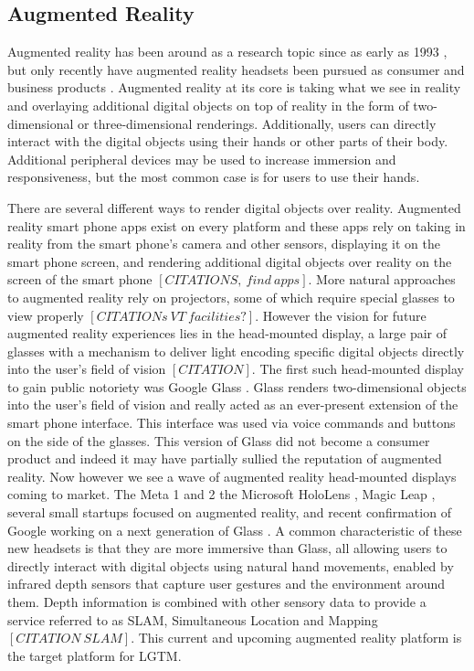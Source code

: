 \documentclass[12pt]{report}
\begin{document}
\subsection{Augmented Reality}
Augmented reality has been around as a research topic since as early as 1993 \cite{RealWorldArWellnet1993}, but only recently have augmented reality headsets been pursued as consumer and business products \cite{MagicLeapWebsite,MetaWebsite,HoloLensWebsite,GoogleGlassWebsite}. Augmented reality at its core is taking what we see in reality and overlaying additional digital objects on top of reality in the form of two-dimensional or three-dimensional renderings. Additionally, users can directly interact with the digital objects using their hands or other parts of their body. Additional peripheral devices may be used to increase immersion and responsiveness, but the most common case is for users to use their hands. \par

There are several different ways to render digital objects over reality. Augmented reality smart phone apps exist on every platform and these apps rely on taking in reality from the smart phone's camera and other sensors, displaying it on the smart phone screen, and rendering additional digital objects over reality on the screen of the smart phone $[CITATIONS, \: find \: apps]$. More natural approaches to augmented reality rely on projectors, some of which require special glasses to view properly $[CITATIONs \: VT \: facilities?]$. However the vision for future augmented reality experiences lies in the head-mounted display, a large pair of glasses with a mechanism to deliver light encoding specific digital objects directly into the user's field of vision $[CITATION]$. The first such head-mounted display to gain public notoriety was Google Glass \cite{GoogleGlassWebsite}. Glass renders two-dimensional objects into the user's field of vision and really acted as an ever-present extension of the smart phone interface. This interface was used via voice commands and buttons on the side of the glasses. This version of Glass did not become a consumer product and indeed it may have partially sullied the reputation of augmented reality. Now however we see a wave of augmented reality head-mounted displays coming to market. The Meta 1 and 2 \cite{MetaWebsite} the Microsoft HoloLens \cite{HoloLensWebsite}, Magic Leap \cite{MagicLeapWebsite}, several small startups focused on augmented reality, and recent confirmation of Google working on a next generation of Glass \cite{WiredGoogleGlassNextGen2015}. A common characteristic of these new headsets is that they are more immersive than Glass, all allowing users to directly interact with digital objects using natural hand movements, enabled by infrared depth sensors that capture user gestures and the environment around them. Depth information is combined with other sensory data to provide a service referred to as SLAM, Simultaneous Location and Mapping $[CITATION \: SLAM]$. This current and upcoming augmented reality platform is the target platform for LGTM. \par
\end{document}
